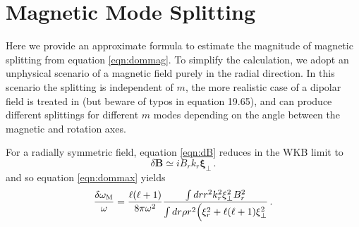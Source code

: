 \appendix

\section{Magnetic Mode Splitting}
\label{magmode}

Here we provide an approximate formula to estimate the magnitude of magnetic splitting from equation \ref{eqn:dommag}. To simplify the calculation, we adopt an unphysical scenario of a magnetic field purely in the radial direction. In this scenario the splitting is independent of $m$, the more realistic case of a dipolar field is treated in \cite{Unno_1989} (but beware of typos in equation 19.65), and can produce different splittings for different $m$ modes depending on the angle between the magnetic and rotation axes.

For a radially symmetric field, equation \ref{eqn:dB} reduces in the WKB limit to 
\begin{equation}
\delta {\boldsymbol B} \simeq i B_r k_r \boldsymbol{\xi}_\perp \, .
\end{equation}
and so equation \ref{eqn:dommax} yields
\begin{equation}
\label{eqn:dommag2}
\frac{\delta \omega_{\rm M}}{\omega} = \frac{\ell(\ell+1)}{8 \pi \omega^2 } \frac{\int d r r^2 k_r^2 \xi_\perp^2 B_r^2}{\int d r \rho r^2 \Big( \xi_r^2 + \ell(\ell+1) \xi_\perp^2 }\, .
\end{equation}